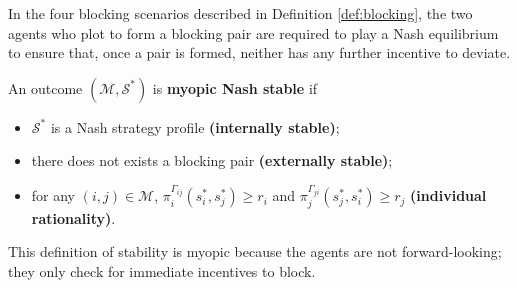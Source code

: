 \documentclass{myPaper}
\begin{document}
In the four blocking scenarios described in Definition \ref{def:blocking}, the two agents who plot to form a blocking pair are required to play a Nash equilibrium to ensure that, once a pair is formed, neither has any further incentive to deviate.

\begin{definition} \label{def:stable}
An outcome $(\mathcal{M}, \mathcal{S}^*)$ is \textbf{myopic Nash stable} if
\begin{itemize}
    \item[(1)] $\mathcal{S}^*$ is a Nash strategy profile \textbf{(internally stable)};
    \item[(2)] there does not exists a blocking pair \textbf{(externally stable)};
    \item[(3)] for any $(i, j) \in \mathcal{M}$, $\pi_i^{\Gamma_{ij}}(s_i^*, s_j^*) \ge r_i$ and $\pi_j^{\Gamma_{ji}}(s_j^*, s_i^*) \ge r_j$ \textbf{(individual rationality)}.
    \end{itemize}
\end{definition}

This definition of stability is myopic because the agents are not forward-looking; they only check for immediate incentives to block.
\end{document}
